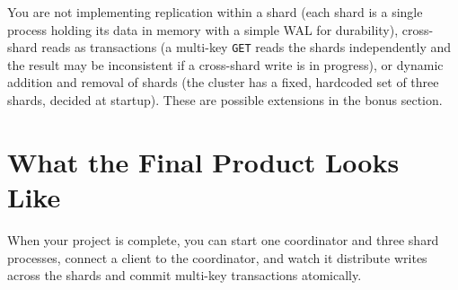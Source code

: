 \documentclass[11pt,a4paper]{article}
\begin{document}
You are not implementing replication within a shard (each shard is a single process holding its data in memory with a simple WAL for durability), cross-shard reads as transactions (a multi-key \texttt{GET} reads the shards independently and the result may be inconsistent if a cross-shard write is in progress), or dynamic addition and removal of shards (the cluster has a fixed, hardcoded set of three shards, decided at startup). These are possible extensions in the bonus section.

\section{What the Final Product Looks Like}

When your project is complete, you can start one coordinator and three shard processes, connect a client to the coordinator, and watch it distribute writes across the shards and commit multi-key transactions atomically.
\end{document}
